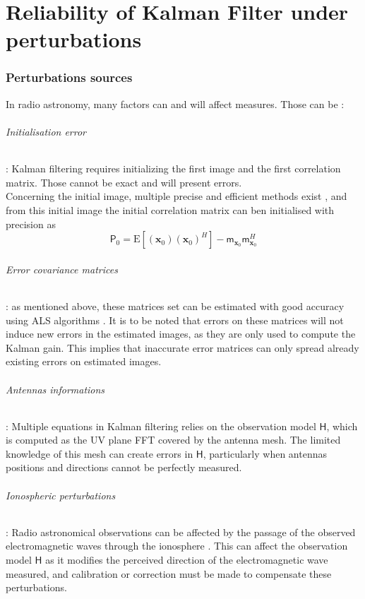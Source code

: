 \documentclass[titlepage,11pt]{article}
\newcommand{\moy}[1]{\boldsymbol{\mathsf{m}}_{#1}}
\newcommand{\autocorr}[1]{\expval{(#1)(#1)^H}}
\renewcommand{\expval}[1]{\text{E}\left[#1\right]}
\renewcommand{\H}{\boldsymbol{\mathsf{H}}}
\newcommand{\x}{\boldsymbol{x}}
\renewcommand{\P}{\boldsymbol{\mathsf{P}}}
\begin{document}
	\newpage
	\part{Reliability of Kalman Filter under perturbations}
	\section{Perturbations sources}
	
	In radio astronomy, many factors can and will affect measures. Those can be :
	\paragraph{Initialisation error} : Kalman filtering requires initializing the first image and the first correlation matrix. Those cannot be exact and will present errors. \\
	Concerning the initial image, multiple precise and efficient methods exist \cite{bible}, and from this initial image the initial correlation matrix can ben initialised\cite{intro_KF} with precision as 
	\begin{equation}\label{p0}
		\P_0 = \autocorr{\x_0} - \moy{\x_0}\moy{\x_0}^H
	\end{equation}
	
	\paragraph{Error covariance matrices} : as mentioned above, these matrices set can be estimated with good accuracy using ALS algorithms \cite{ALS}. It is to be noted that errors on these matrices will not induce new errors in the estimated images, as they are only used to compute the Kalman gain. This implies that inaccurate error matrices can only spread already existing errors on estimated images.
	
	\paragraph{Antennas informations} : Multiple equations in Kalman filtering relies on the observation model $\H$, which is computed as the UV plane FFT covered by the antenna mesh. The limited knowledge of this mesh can create errors in $\H$, particularly when antennas positions and directions cannot be perfectly measured.
	
	\paragraph{Ionospheric perturbations} : Radio astronomical observations can be affected by the passage of the observed electromagnetic waves through the ionosphere \cite{iono}. This can affect the observation model $\H$ as it modifies the perceived direction of the electromagnetic wave measured, and calibration or correction must be made to compensate these perturbations.
	
\end{document}
